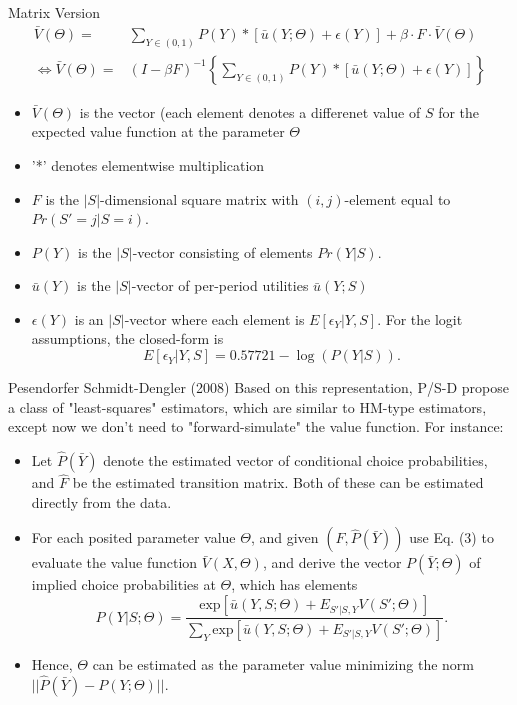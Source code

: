 \begin{frame}{Matrix Version}
\begin{equation}
\begin{split}
\bar V (\Theta) = & \sum_{Y \in (0,1)} P(Y) * [\bar u (Y; \Theta) + \epsilon(Y)] + \beta \cdot F \cdot \bar V (\Theta) \\
\Leftrightarrow \bar V (\Theta) = & (I - \beta F)^{-1} \left \{ \sum_{Y \in (0,1)} P(Y) * [ \bar u (Y; \Theta) + \epsilon(Y) ] \right \}
\end{split}
\end{equation}
\begin{itemize}
\item  $\bar V(\Theta)$  is the vector (each element denotes a differenet value of $S$ for the expected value function at the parameter $\Theta$ \\
\item '*' denotes elementwise multiplication \\
\item $F$ is the $|S|$-dimensional square matrix with $(i,j)$-element equal to $Pr(S' = j | S = i)$. 
\item $P(Y)$ is the $|S|$-vector consisting of elements $Pr(Y|S)$. 
\item $\bar u (Y)$ is the $|S|$-vector of per-period utilities $\bar u (Y;S)$
\item $\epsilon(Y)$ is an $|S|$-vector where each element is $E[\epsilon_Y | Y,S]$. For the logit assumptions, the closed-form is 
\begin{equation}E[\epsilon_Y|Y,S] = 0.57721- \log(P(Y|S)).\end{equation}
\end{itemize}
\end{frame}

\begin{frame}{Pesendorfer Schmidt-Dengler (2008)}
Based on this representation, P/S-D propose a class of "least-squares" estimators, which are similar to HM-type estimators, except now we don't need to "forward-simulate" the value function. For instance:\\
\begin{itemize}
\item Let $\hat P (\bar Y)$ denote the estimated vector of conditional choice probabilities, and $\hat F$ be the estimated transition matrix. Both of these can be estimated directly from the data.
\item For each posited parameter value $\Theta$, and given $( \hat F, \hat P (\bar Y))$ use Eq. (3) to evaluate the value function $\bar V(X, \Theta)$, and derive the vector $P(\bar Y; \Theta)$ of implied choice probabilities at $\Theta$, which has elements
\begin{equation*}
P(Y|S;\Theta) = \frac {\text{exp} [ \bar u(Y,S; \Theta) + E_{S'|S,Y} V(S';\Theta)]}{\sum_Y \text{exp}[\bar u (Y,S;\Theta) + E_{S'|S,Y} V(S';\Theta)]}. 
\end{equation*}
\item Hence, $\Theta$ can be estimated as the parameter value minimizing the norm $|| \hat P(\bar Y) - P(Y;\Theta)||$.
\end{itemize}
\end{frame}

